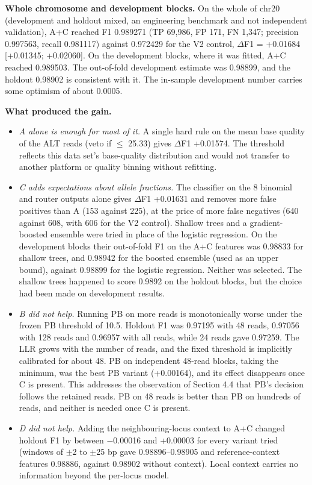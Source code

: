 \documentclass[11pt,a4paper]{article}
\begin{document}
\textbf{Whole chromosome and development blocks.} On the whole of chr20 (development and holdout mixed, an engineering benchmark and not independent validation), A+C reached F1 0.989271 (TP 69,986, FP 171, FN 1,347; precision 0.997563, recall 0.981117) against 0.972429 for the V2 control, $\Delta$F1 = +0.01684 [+0.01345; +0.02060]. On the development blocks, where it was fitted, A+C reached 0.989503. The out-of-fold development estimate was 0.98899, and the holdout 0.98902 is consistent with it. The in-sample development number carries some optimism of about 0.0005.

\textbf{What produced the gain.}

\begin{itemize}[leftmargin=1.6em,itemsep=2pt,topsep=3pt]
\item \emph{A alone is enough for most of it.} A single hard rule on the mean base quality of the ALT reads (veto if $\le$ 25.33) gives $\Delta$F1 +0.01574. The threshold reflects this data set's base-quality distribution and would not transfer to another platform or quality binning without refitting.
\item \emph{C adds expectations about allele fractions.} The classifier on the 8 binomial and router outputs alone gives $\Delta$F1 +0.01631 and removes more false positives than A (153 against 225), at the price of more false negatives (640 against 608, with 606 for the V2 control). Shallow trees and a gradient-boosted ensemble were tried in place of the logistic regression. On the development blocks their out-of-fold F1 on the A+C features was 0.98833 for shallow trees, and 0.98942 for the boosted ensemble (used as an upper bound), against 0.98899 for the logistic regression. Neither was selected. The shallow trees happened to score 0.9892 on the holdout blocks, but the choice had been made on development results.
\item \emph{B did not help.} Running PB on more reads is monotonically worse under the frozen PB threshold of 10.5. Holdout F1 was 0.97195 with 48 reads, 0.97056 with 128 reads and 0.96957 with all reads, while 24 reads gave 0.97259. The LLR grows with the number of reads, and the fixed threshold is implicitly calibrated for about 48. PB on independent 48-read blocks, taking the minimum, was the best PB variant (+0.00164), and its effect disappears once C is present. This addresses the observation of Section 4.4 that PB's decision follows the retained reads. PB on 48 reads is better than PB on hundreds of reads, and neither is needed once C is present.
\item \emph{D did not help.} Adding the neighbouring-locus context to A+C changed holdout F1 by between $-$0.00016 and +0.00003 for every variant tried (windows of $\pm$2 to $\pm$25 bp gave 0.98896--0.98905 and reference-context features 0.98886, against 0.98902 without context). Local context carries no information beyond the per-locus model.

\end{itemize}
\end{document}
